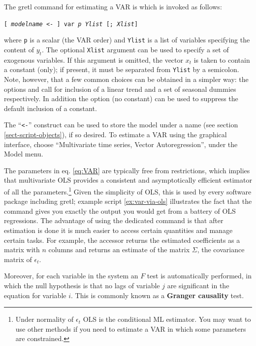 The gretl command for estimating a VAR is  which is invoked as
follows:
\begin{flushleft}
    \texttt{[ \emph{modelname} \textless - ] var \emph{p} \emph{Ylist} [;
    \emph{Xlist}]}
\end{flushleft}
where \texttt{p} is a scalar (the VAR order) and \texttt{Ylist} is a
list of variables specifying the content of $y_t$.  The optional
\texttt{Xlist} argument can be used to specify a set of exogenous
variables. If this argument is omitted, the vector $x_t$ is taken to
contain a constant (only); if present, it must be separated from
\texttt{Ylist} by a semicolon. Note, however, that a few common
choices can be obtained in a simpler way: the options 
and  call for inclusion of a linear trend and a set
of seasonal dummies respectively. In addition the  option
(no constant) can be used to suppress the default inclusion of a
constant.

The ``\texttt{\textless -}'' construct can be used to store the model
under a name (see section \ref{sect-script-objects}), if so desired. To
estimate a VAR using the graphical interface, choose ``Multivariate time
series, Vector Autoregression'', under the \textsf{Model} menu.

The parameters in eq. \eqref{eq:VAR} are typically free from
restrictions, which implies that multivariate OLS provides a consistent
and asymptotically efficient estimator of all the
parameters.\footnote{Under normality of $\epsilon_t$ OLS is the
  conditional ML estimator. You may want to use other methods if you
  need to estimate a VAR in which some parameters are constrained.}
Given the simplicity of OLS, this is used by every software package
including gretl; example script \ref{ex:var-via-ols} illustrates the
fact that the  command gives you exactly the output you would
get from a battery of OLS regressions. The advantage of using the
dedicated command is that after estimation is done it is much easier
to access certain quantities and manage certain tasks. For example, the
 accessor returns the estimated coefficients as a matrix
with $n$ columns and  returns an estimate of the matrix
$\Sigma$, the covariance matrix of $\epsilon_t$.

Moreover, for each variable in the system an $F$ test is automatically
performed, in which the null hypothesis is that no lags of variable
$j$ are significant in the equation for variable $i$. This is commonly
known as a \textbf{Granger causality} test.

